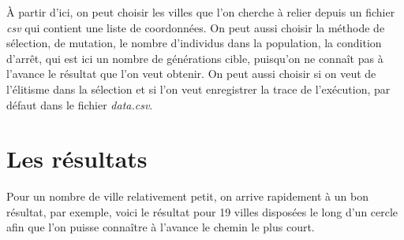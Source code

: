 \documentclass[11pt]{article}
\begin{document}
À partir d'ici, on peut choisir les villes que l'on cherche à relier depuis un fichier \emph{csv} qui contient une liste
de coordonnées. On peut aussi choisir la méthode de sélection, de mutation, le nombre d'individus dans la population, la condition
d'arrêt, qui est ici un nombre de générations cible, puisqu'on ne connaît pas à l'avance le résultat que l'on veut obtenir.
On peut aussi choisir si on veut de l'élitisme dans la sélection et si l'on veut enregistrer la trace de l'exécution, par défaut
dans le fichier \emph{data.csv}.

\section{Les résultats}
\label{sec-3}

Pour un nombre de ville relativement petit, on arrive rapidement à un bon résultat, par exemple, voici le résultat pour 19 villes disposées
le long d'un cercle afin que l'on puisse connaître à l'avance le chemin le plus court.
\end{document}
